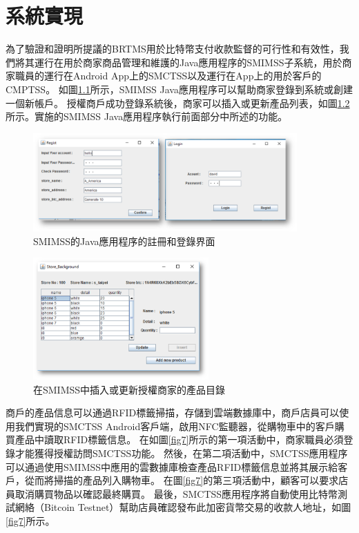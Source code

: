 \chapter{系統實現}


為了驗證和證明所提議的BRTMS用於比特幣支付收款監督的可行性和有效性，我們將其運行在用於商家商品管理和維護的Java應用程序的SMIMSS子系統，用於商家職員的運行在Android App上的SMCTSS以及運行在App上的用於客戶的CMPTSS。
如圖\ref{fig5}所示，SMIMSS Java應用程序可以幫助商家登錄到系統或創建一個新帳戶。 授權商戶成功登錄系統後，商家可以插入或更新產品列表，如圖\ref{fig6}所示。實施的SMIMSS Java應用程序執行前面部分中所述的功能。

\begin{figure}[!htbp]
	\centering
	\includegraphics[width = 0.9\textwidth]{fig5.png}
	\caption{SMIMSS的Java應用程序的註冊和登錄界面}\label{fig5}
\end{figure}

\begin{figure}[!htbp]
	\centering
	\includegraphics[width = 0.6\textwidth]{fig6.png}
	\caption{在SMIMSS中插入或更新授權商家的產品目錄}\label{fig6}
\end{figure}

商戶的產品信息可以通過RFID標籤掃描，存儲到雲端數據庫中，商戶店員可以使用我們實現的SMCTSS Android客戶端，啟用NFC監聽器，從購物車中的客戶購買產品中讀取RFID標籤信息。 在如圖\ref{fig7}所示的第一項活動中，商家職員必須登錄才能獲得授權訪問SMCTSS功能。 然後，在第二項活動中，SMCTSS應用程序可以通過使用SMIMSS中應用的雲數據庫檢查產品RFID標籤信息並將其展示給客戶，從而將掃描的產品列入購物車。 在圖\ref{fig7}的第三項活動中，顧客可以要求店員取消購買物品以確認最終購買。 最後，SMCTSS應用程序將自動使用比特幣測試網絡（Bitcoin Testnet）\supercite{bitcointestnet}幫助店員確認發布此加密貨幣交易的收款人地址，如圖\ref{fig7}所示。    


